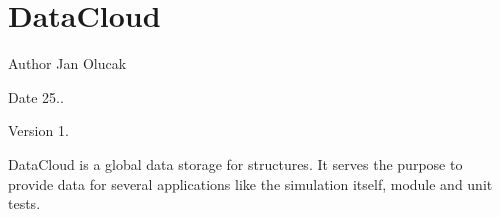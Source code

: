 \hypertarget{group___data_cloud}{}\section{Data\+Cloud}
\label{group___data_cloud}
\begin{DoxyAuthor}{Author}
Jan Olucak 
\end{DoxyAuthor}
\begin{DoxyDate}{Date}
25.. 
\end{DoxyDate}
\begin{DoxyVersion}{Version}
1.
\end{DoxyVersion}
Data\+Cloud is a global data storage for structures. It serves the purpose to provide data for several applications like the simulation itself, module and unit tests. 